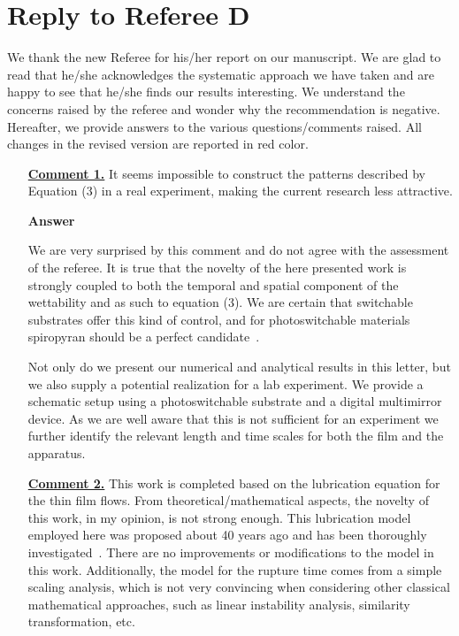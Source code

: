 \documentclass[12pt,english]{article}
\begin{document}

\section*{Reply to Referee D}
We thank the new Referee for his/her report on our manuscript. 
We are glad to read that he/she acknowledges the systematic approach we have taken and are happy to see that he/she finds our results interesting. 
We understand the concerns raised by the referee and wonder why the recommendation is negative.
Hereafter, we provide answers to the various questions/comments raised. 
All changes in the revised version are reported in red color.

\begin{itemize}

\item[ \textbf{\underline{Comment 1.}}]
{ 
It seems impossible to construct the patterns described by Equation (3) in a real experiment, making the current research less attractive.
}

\item[ \textbf{{Answer}}]
{
We are very surprised by this comment and do not agree with the assessment of the referee. 
It is true that the novelty of the here presented work is strongly coupled to both the temporal and spatial component of the wettability and as such to equation (3).
We are certain that switchable substrates offer this kind of control, and for photoswitchable materials spiropyran should be a perfect candidate~\cite{keyvanradSpiropyranbasedAdvancedPhotoswitchable2022}. 

Not only do we present our numerical and analytical results in this letter, but we also supply a potential realization for a lab experiment. 
We provide a schematic setup using a photoswitchable substrate and a digital multimirror device. 
As we are well aware that this is not sufficient for an experiment we further identify the relevant length and time scales for both the film and the apparatus.
}

\item[ \textbf{\underline{Comment 2.}}] 
{
This work is completed based on the lubrication equation for the thin film flows.
From theoretical/mathematical aspects, the novelty of this work, in my opinion, is not strong enough. 
This lubrication model employed here was proposed about 40 years ago and has been thoroughly investigated~\cite{RevModPhys.69.931, RevModPhys.81.1131}. 
There are no improvements or modifications to the model in this work. 
Additionally, the model for the rupture time comes from a simple scaling analysis, which is not very convincing when considering other classical mathematical approaches, such as linear instability analysis, similarity transformation, etc.
}


\end{itemize}
\end{document}
